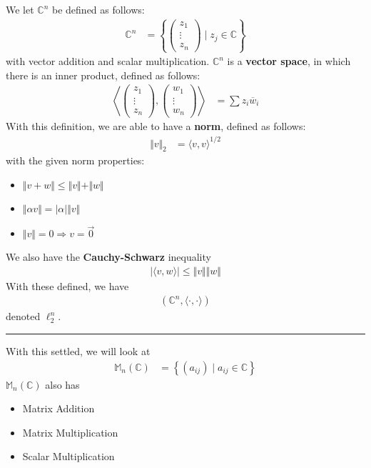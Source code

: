 \documentclass[8pt]{extarticle}
\title{}
\author{Avinash Iyer}
\date{}
\newcommand{\C}{\mathbb{C}}
\begin{document}
  We let $\C^n$ be defined as follows:
  \begin{align*}
    \C^n &= \left\{ \begin{pmatrix}
      z_1\\ \vdots \\z_n
    \end{pmatrix} \mid z_j\in\C \right\}
  \end{align*}
  with vector addition and scalar multiplication. $\C^n$ is a \textbf{vector space}, in which there is an inner product, defined as follows:
  \begin{align*}
    \left\langle \begin{pmatrix}z_1 \\ \vdots \\ z_n\end{pmatrix}, \begin{pmatrix}w_1 \\ \vdots \\ w_n\end{pmatrix}\right\rangle &= \sum z_i\overline{w}_i
  \end{align*}
  With this definition, we are able to have a \textbf{norm}, defined as follows:
  \begin{align*}
    \Vert v \Vert_2 &= \langle v,v\rangle^{1/2}
  \end{align*}
  with the given norm properties:
  \begin{itemize}
    \item $\Vert v+w\Vert \leq \Vert v\Vert + \Vert w \Vert$
    \item $\Vert \alpha v \Vert = |\alpha| \Vert v \Vert$
    \item $\Vert v \Vert = 0 \Rightarrow v = \vec{0}$
  \end{itemize}
  We also have the \textbf{Cauchy-Schwarz} inequality
  \begin{align*}
    |\langle v,w\rangle| \leq \Vert v \Vert \Vert w \Vert
  \end{align*}
  With these defined, we have
  \begin{align*}
    (\C^n,\langle \cdot , \cdot \rangle)
  \end{align*}
   denoted $\ell_2^n$.\\
  \rule{\textwidth}{0.4pt}
   With this settled, we will look at
   \begin{align*}
     \mathbb{M}_n(\C) &= \left\{(a_{ij}) \mid a_{ij}\in\C\right\}
   \end{align*}
   $\mathbb{M}_n(\C)$ also has
   \begin{itemize}
    \item Matrix Addition
    \item Matrix Multiplication
    \item Scalar Multiplication
   \end{itemize}
\end{document}
